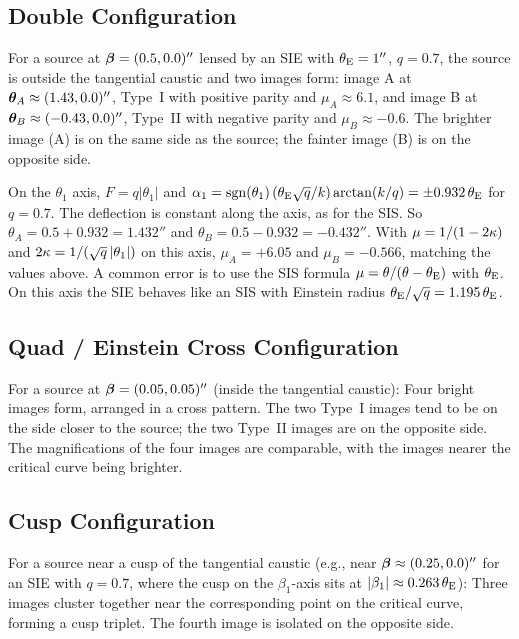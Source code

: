 \subsection{Double Configuration}

For a source at $\boldsymbol{\beta} = (0.5, 0.0)''$ lensed by an SIE with
$\theta_{\mathrm{E}} = 1''$, $q = 0.7$, the source is outside the tangential
caustic and two images form: image A at
$\boldsymbol{\theta}_A \approx (1.43, 0.0)''$, Type~I with positive parity and
$\mu_A \approx 6.1$, and image B at
$\boldsymbol{\theta}_B \approx (-0.43, 0.0)''$, Type~II with negative parity
and $\mu_B \approx -0.6$.  The brighter image (A) is on the same side as the source; the
fainter image (B) is on the opposite side.

\begin{annotation}
On the $\theta_1$ axis, $F = q|\theta_1|$ and
$\alpha_1 = \mathrm{sgn}(\theta_1)\,(\theta_{\mathrm{E}}\sqrt{q}/k)\arctan(k/q) =
\pm 0.932\,\theta_{\mathrm{E}}$ for $q = 0.7$.  The deflection is constant along the axis,
as for the SIS.  So $\theta_A = 0.5 + 0.932 = 1.432''$ and
$\theta_B = 0.5 - 0.932 = -0.432''$.  With $\mu = 1/(1-2\kappa)$ and
$2\kappa = 1/(\sqrt{q}\,|\theta_1|)$ on this axis, $\mu_A = +6.05$ and
$\mu_B = -0.566$, matching the values above.  A common error is to use the
SIS formula $\mu = \theta/(\theta-\theta_{\mathrm{E}})$ with $\theta_{\mathrm{E}}$.  On this axis the SIE
behaves like an SIS with Einstein radius $\theta_{\mathrm{E}}/\sqrt{q} = 1.195\,\theta_{\mathrm{E}}$.
\end{annotation}


\subsection{Quad / Einstein Cross Configuration}

For a source at $\boldsymbol{\beta} = (0.05, 0.05)''$ (inside the tangential
caustic):  Four bright images form, arranged in a cross pattern.
The two Type~I images tend to be on the side closer to the source;
the two Type~II images are on the opposite side.  The magnifications
of the four images are comparable, with the images nearer the
critical curve being brighter.

\subsection{Cusp Configuration}

For a source near a cusp of the tangential caustic (e.g., near
$\boldsymbol{\beta} \approx (0.25, 0.0)''$ for an SIE with $q = 0.7$, where the
cusp on the $\beta_1$-axis sits at $|\beta_1| \approx 0.263\,\theta_{\mathrm{E}}$):
Three images cluster together near the corresponding point on the
critical curve, forming a cusp triplet.  The fourth image is
isolated on the opposite side.

